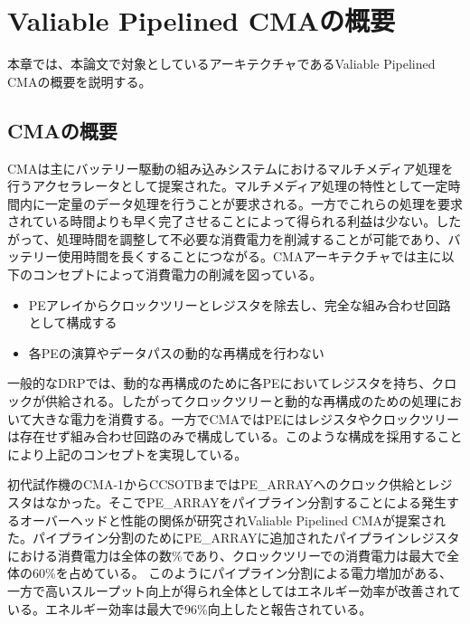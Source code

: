 \chapter{Valiable Pipelined CMAの概要}
{
\label{chap:vpcma}
本章では、本論文で対象としているアーキテクチャであるValiable Pipelined CMAの概要を説明する。
\section{CMAの概要}
\label{sec:about_cma}
CMAは主にバッテリー駆動の組み込みシステムにおけるマルチメディア処理を行うアクセラレータとして提案された。\cite{cma_micro}マルチメディア処理の特性として一定時間内に一定量のデータ処理を行うことが要求される。一方でこれらの処理を要求されている時間よりも早く完了させることによって得られる利益は少ない。したがって、処理時間を調整して不必要な消費電力を削減することが可能であり、バッテリー使用時間を長くすることにつながる。CMAアーキテクチャでは主に以下のコンセプトによって消費電力の削減を図っている。

\begin{itemize}
\item PEアレイからクロックツリーとレジスタを除去し、完全な組み合わせ回路として構成する
\item 各PEの演算やデータパスの動的な再構成を行わない
\end{itemize}

一般的なDRPでは、動的な再構成のために各PEにおいてレジスタを持ち、クロックが供給される。したがってクロックツリーと動的な再構成のための処理において大きな電力を消費する。一方でCMAではPEにはレジスタやクロックツリーは存在せず組み合わせ回路のみで構成している。このような構成を採用することにより上記のコンセプトを実現している。

初代試作機のCMA-1からCCSOTBまではPE\_ARRAYへのクロック供給とレジスタはなかった。そこでPE\_ARRAYをパイプライン分割することによる発生するオーバーヘッドと性能の関係が研究されValiable Pipelined CMAが提案された。\cite{vpcma}パイプライン分割のためにPE\_ARRAYに追加されたパイプラインレジスタにおける消費電力は全体の数\%であり、クロックツリーでの消費電力は最大で全体の60\%を占めている。
このようにパイプライン分割による電力増加がある、一方で高いスループット向上が得られ全体としてはエネルギー効率が改善されている。エネルギー効率は最大で96\%向上したと報告されている。


}
